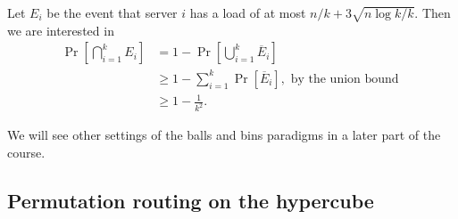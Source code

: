 Let $E_i$ be the event that server $i$ has a load of at most $n/k + 3\sqrt{n\log k/k}$. Then we are interested in 
\begin{align*}
	\Pr\left[ \bigcap_{i=1}^k E_i \right] &= 1 - \Pr\left[ \bigcup_{i=1}^k \overline{E}_i \right]\\
	& \geq 1 - \sum_{i=1}^k \Pr[\overline{E}_i], \text{ by the union bound }\\
	& \geq 1 - \frac{1}{k^2}.
\end{align*}

We will see other settings of the balls and bins paradigms in a later part of the course.

\subsection{Permutation routing on the hypercube}

%
%
